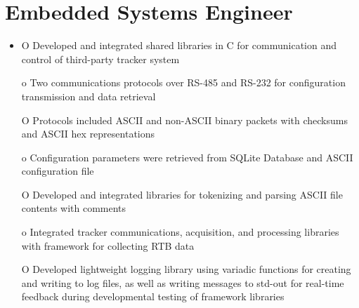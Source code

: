 \documentclass[a4paper]{article}
\begin{document}
\section{Embedded Systems Engineer}
\begin{itemize}
	\item
O Developed and integrated shared libraries in C for communication and control of third-party tracker system

o Two communications protocols over RS-485 and RS-232 for configuration transmission and data retrieval

O Protocols included ASCII and non-ASCII binary packets with checksums and ASCII hex representations

o Configuration parameters were retrieved from SQLite Database and ASCII configuration file

O Developed and integrated libraries for tokenizing and parsing ASCII file contents with comments

o Integrated tracker communications, acquisition, and processing libraries with framework for collecting RTB data

O Developed lightweight logging library using variadic functions for creating and 
writing to log files, as well as writing messages to std-out for real-time feedback 
during developmental testing of framework libraries


\end{itemize}
\end{document}
